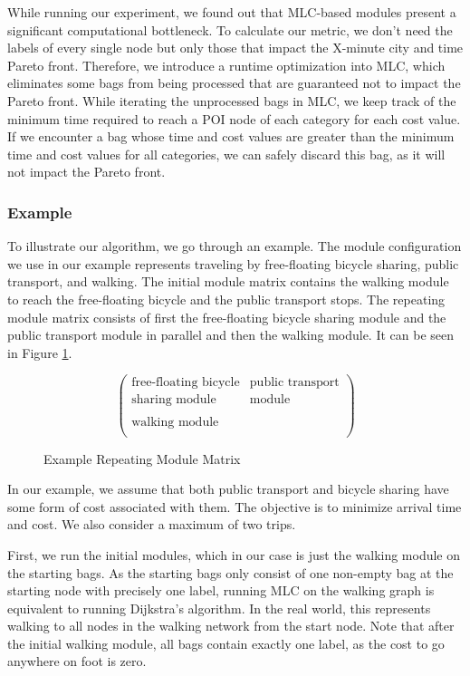While running our experiment, we found out that MLC-based modules present a significant computational bottleneck.
To calculate our metric, we don't need the labels of every single node but only those that impact the X-minute city and time Pareto front.
Therefore, we introduce a runtime optimization into MLC, which eliminates some bags from being processed that are guaranteed not to impact the Pareto front.
While iterating the unprocessed bags in MLC, we keep track of the minimum time required to reach a POI node of each category for each cost value.
If we encounter a bag whose time and cost values are greater than the minimum time and cost values for all categories, we can safely discard this bag, as it will not impact the Pareto front.


\subsubsection{Example}
\label{subsubsec:example}

To illustrate our algorithm, we go through an example.
The module configuration we use in our example represents traveling by free-floating bicycle sharing, public transport, and walking.
The initial module matrix contains the walking module to reach the free-floating bicycle and the public transport stops.
The repeating module matrix consists of first the free-floating bicycle sharing module and the public transport module in parallel and then the walking module.
It can be seen in Figure \ref{fig:example_module_matrix}.


\begin{figure}[ht]
\centering
\[
\begin{pmatrix}
\text{free-floating bicycle} & \text{public transport} \\
\text{sharing module} & \text{module} \\
\\
\text{walking module} & \\
\end{pmatrix}
\]
\caption{Example Repeating Module Matrix}
\label{fig:example_module_matrix}
\end{figure}

In our example, we assume that both public transport and bicycle sharing have some form of cost associated with them.
The objective is to minimize arrival time and cost.
We also consider a maximum of two trips.

First, we run the initial modules, which in our case is just the walking module on the starting bags.
As the starting bags only consist of one non-empty bag at the starting node with precisely one label, running MLC on the walking graph is equivalent to running Dijkstra's algorithm.
In the real world, this represents walking to all nodes in the walking network from the start node.
Note that after the initial walking module, all bags contain exactly one label, as the cost to go anywhere on foot is zero.

